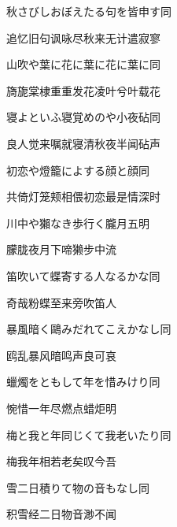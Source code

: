 \begin{haiku}
    {\FH 秋さびしおぼえたる句を皆申す}\hfill{\FH 同}

    {\FK 追忆旧句讽咏尽秋来无计遣寂寥}
\end{haiku}

\begin{haiku}
    {\FH 山吹や葉に花に葉に花に葉に}\hfill{\FH 同}

    {\FK 旖旎棠棣重重发花凌叶兮叶载花}
\end{haiku}

\begin{haiku}
    {\FH 寝よといふ寝覚めのや小夜砧}\hfill{\FH 同}

    {\FK 良人觉来嘱就寝清秋夜半闻砧声}
\end{haiku}

\begin{haiku}
    {\FH 初恋や燈籠によする顔と顔}\hfill{\FH 同}

    {\FK 共倚灯笼颊相偎初恋最是情深时}
\end{haiku}

\begin{haiku}
    {\FH 川中や獺なき歩行く朧月}\hfill{\FH 五明}

    {\FK 朦胧夜月下啼獭步中流}
\end{haiku}

\begin{haiku}
    {\FH 笛吹いて蝶寄する人なるかな}\hfill{\FH 同}

    {\FK 奇哉粉蝶至来旁吹笛人}
\end{haiku}

\begin{haiku}
    {\FH 暴風暗く鷗みだれてこえかなし}\hfill{\FH 同}

    {\FK 鸥乱暴风暗鸣声良可哀}
\end{haiku}

\begin{haiku}
    {\FH 蠟燭をともして年を惜みけり}\hfill{\FH 同}

    {\FK 惋惜一年尽燃点蜡炬明}
\end{haiku}

\begin{haiku}
    {\FH 梅と我と年同じくて我老いたり}\hfill{\FH 同}

    {\FK 梅我年相若老矣叹今吾}
\end{haiku}

\begin{haiku}
    {\FH 雪二日積りて物の音もなし}\hfill{\FH 同}

    {\FK 积雪经二日物音渺不闻}
\end{haiku}

